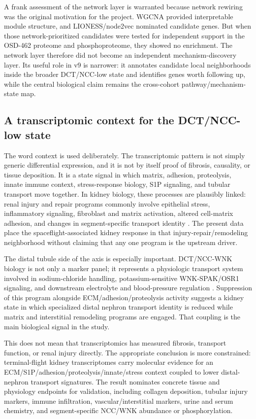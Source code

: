 \documentclass[11pt]{article}
\begin{document}
A frank assessment of the network layer is warranted because network rewiring was the original motivation for the project. WGCNA provided interpretable module structure, and LIONESS/node2vec nominated candidate genes. But when those network-prioritized candidates were tested for independent support in the OSD-462 proteome and phosphoproteome, they showed no enrichment. The network layer therefore did not become an independent mechanism-discovery layer. Its useful role in v9 is narrower: it annotates candidate local neighborhoods inside the broader DCT/NCC-low state and identifies genes worth following up, while the central biological claim remains the cross-cohort pathway/mechanism-state map.

\subsection{A transcriptomic context for the DCT/NCC-low state}

The word context is used deliberately. The transcriptomic pattern is not simply generic differential expression, and it is not by itself proof of fibrosis, causality, or tissue deposition. It is a state signal in which matrix, adhesion, proteolysis, innate immune context, stress-response biology, S1P signaling, and tubular transport move together. In kidney biology, these processes are plausibly linked: renal injury and repair programs commonly involve epithelial stress, inflammatory signaling, fibroblast and matrix activation, altered cell-matrix adhesion, and changes in segment-specific transport identity \citep{liu2011fibrosis,natneph2024fibrosis,jci2024fibrosis,chavula2022cadherin}. The present data place the spaceflight-associated kidney response in that injury-repair/remodeling neighborhood without claiming that any one program is the upstream driver.

The distal tubule side of the axis is especially important. DCT/NCC-WNK biology is not only a marker panel; it represents a physiologic transport system involved in sodium-chloride handling, potassium-sensitive WNK-SPAK/OSR1 signaling, and downstream electrolyte and blood-pressure regulation \citep{castaneda2024dct,ge2016wnk}. Suppression of this program alongside ECM/adhesion/proteolysis activity suggests a kidney state in which specialized distal nephron transport identity is reduced while matrix and interstitial remodeling programs are engaged. That coupling is the main biological signal in the study.

This does not mean that transcriptomics has measured fibrosis, transport function, or renal injury directly. The appropriate conclusion is more constrained: terminal-flight kidney transcriptomes carry molecular evidence for an ECM/S1P/adhesion/proteolysis/innate/stress context coupled to lower distal-nephron transport signatures. The result nominates concrete tissue and physiology endpoints for validation, including collagen deposition, tubular injury markers, immune infiltration, vascular/interstitial markers, urine and serum chemistry, and segment-specific NCC/WNK abundance or phosphorylation.
\end{document}
